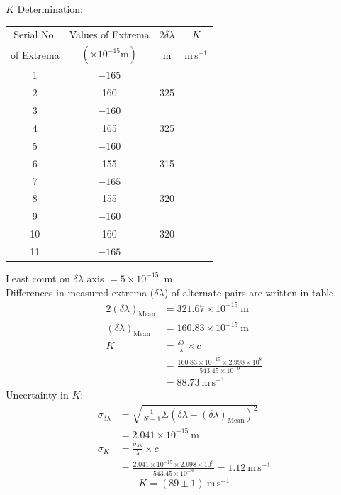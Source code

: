 \begin{description}
$K$ Determination:
\begin{center}
\begin{tabular}{cccc}
\toprule
Serial No. & Values of Extrema & $2\delta\lambda$ & $K$\\
of Extrema & $(\times10^{-15}\mathrm{m})$ & m & m\,s$^{-1}$\\
\midrule
1 & $-165$ & & \\
2 & 160 & 325 & \\
3 & $-160$ & & \\
4 & 165 & 325 & \\
5 & $-160$ & & \\
6 & 155 & 315 & \\
7 & $-165$ & & \\
8 & 155 & 320 & \\
9 & $-160$ & & \\
10 & 160 & 320 & \\
11 & $-165$ & & \\
\bottomrule
\end{tabular}
\end{center}

Least count on $\delta\lambda$ axis $= 5\times10^{-15}$~m\\
Differences in measured extrema ($\delta\lambda$) of alternate pairs are
written in table.
\begin{align*}
2(\delta\lambda)_{\mathrm{Mean}} &= 321.67\times10^{-15}\ \mathrm{m}\\
(\delta\lambda)_{\mathrm{Mean}} &= 160.83\times10^{-15}\ \mathrm{m}\\
K &= \frac{\delta\lambda}{\lambda}\times c\\
  &= \frac{160.83\times10^{-15}\times2.998\times10^{8}}{543.45\times10^{-9}}\\
  &= 88.73\ \mathrm{m\,s^{-1}}
\end{align*}
Uncertainty in $K$:
\begin{align*}
\sigma_{\delta\lambda} &= \sqrt{\frac{1}{N-1}
  \Sigma\left(\delta\lambda-(\delta\lambda)_{\mathrm{Mean}}\right)^2}\\
  &= 2.041\times10^{-15}\ \mathrm{m}\\
\sigma_K &= \frac{\sigma_{\delta\lambda}}{\lambda}\times c\\
  &= \frac{2.041\times10^{-15}\times2.998\times10^{8}}{543.45\times10^{-9}}
   = 1.12\ \mathrm{m\,s^{-1}}
\end{align*}
\[ \boxed{K = (89\pm1)\ \mathrm{m\,s^{-1}}} \]


\end{description}
